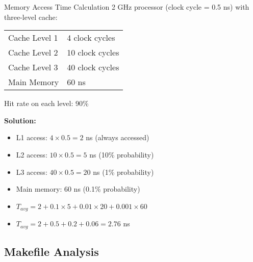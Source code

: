 \begin{example2}{Memory Access Time Calculation}
    2 GHz processor (clock cycle = 0.5 ns) with three-level cache:
    
    \begin{tabular}{|l|l|}
        \hline
        Cache Level 1 & 4 clock cycles \\
        Cache Level 2 & 10 clock cycles \\
        Cache Level 3 & 40 clock cycles \\
        Main Memory & 60 ns \\
        \hline
    \end{tabular}
    
    Hit rate on each level: 90\%
    
    \tcblower
    
    \textbf{Solution:}
    \begin{itemize}
        \item L1 access: $4 \times 0.5 = 2$ ns (always accessed)
        \item L2 access: $10 \times 0.5 = 5$ ns (10\% probability)
        \item L3 access: $40 \times 0.5 = 20$ ns (1\% probability)  
        \item Main memory: 60 ns (0.1\% probability)
        \item $T_{avg} = 2 + 0.1 \times 5 + 0.01 \times 20 + 0.001 \times 60$
        \item $T_{avg} = 2 + 0.5 + 0.2 + 0.06 = 2.76$ ns
    \end{itemize}
\end{example2}

\subsection{Makefile Analysis}

